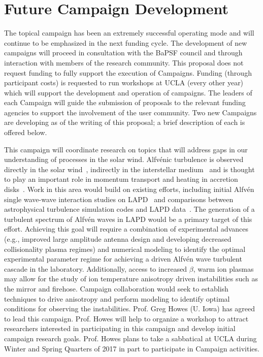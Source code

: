 \documentclass[11pt]{article}
\newcommand\Alfven{Alfv\'en }
\renewcommand{\cite}{\citep}
\begin{document}
\section{Future Campaign Development}

The topical campaign has been an extremely successful operating mode
and will continue to be emphasized in the next funding cycle. The
development of new campaigns will proceed in consultation with the
BaPSF council and through interaction with members of the research
community.  This proposal does not request funding to fully support
the execution of Campaigns.  Funding (through participant costs) is
requested to run workshops at UCLA (every other year) which will support the
development and operation of campaigns.  The leaders of
each Campaign will guide the submission of proposals to the relevant funding agencies to
support the involvement of the user community.  Two new Campaigns are
developing as of the writing of this proposal; a brief description of
each is offered below.  

 This campaign will
  coordinate research on topics that will address gaps in our
  understanding of processes in the solar wind.  Alfv\'{e}nic
  turbulence is observed directly in the solar wind~\cite{bale05,alexandrova08},
  indirectly in the interstellar medium~\cite{armstrong95} and is thought to play
  an important role in momentum transport and heating in accretion
  disks~\cite{balbus98}.  Work in this area would build on existing efforts,
  including initial \Alfven single wave-wave interaction studies on
  LAPD~\cite{carter:2006,auerbach:2010,auerbach:2011,dorfman:2013,dorfman:2015} and comparisons between astrophysical
  turbulence simulation codes and LAPD data~\cite{nielson:2010,howes:2012,howes:2013}.  The generation
  of a turbulent spectrum of Alfv\'{e}n waves in LAPD would be a
  primary target of this effort.  Achieving this goal will require a
  combination of experimental advances (e.g., improved large amplitude
  antenna design and developing decreased collisionality plasma regimes) and
  numerical modeling to identify the optimal experimental parameter
  regime for achieving a driven Alfv\'{e}n wave turbulent cascade in
  the laboratory.  Additionally, access to increased $\beta$, warm ion
  plasmas may allow for the study of ion temperature anisotropy driven
  instabilities such as the mirror and firehose.  Campaign
  collaboration would seek to establish techniques to drive anisotropy
  and perform modeling to identify optimal conditions for observing
  the instabilities.  Prof. Greg Howes (U. Iowa) has agreed to
  lead this campaign.  Prof. Howes will help to organize a workshop to
  attract researchers interested in participating in this campaign and
  develop initial campaign research goals.  Prof. Howes plans to take
  a sabbatical at UCLA during Winter and Spring Quarters of 2017 in
  part to participate in Campaign activities.  
\end{document}
